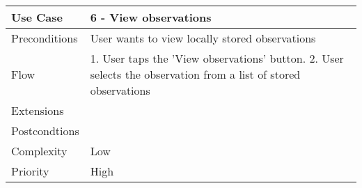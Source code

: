 \\
\begin{tabular}[t]{|l|p{}|}\hline
Use Case&6 - View observations\\\hline
Preconditions&User wants to view locally stored observations\\\hline
Flow&1. User taps the 'View observations' button.
2. User selects the observation from a list of stored observations \\\hline
Extensions& \\\hline
Postcondtions&\\\hline
Complexity&Low\\\hline
Priority&High\\\hline
\end{tabular}